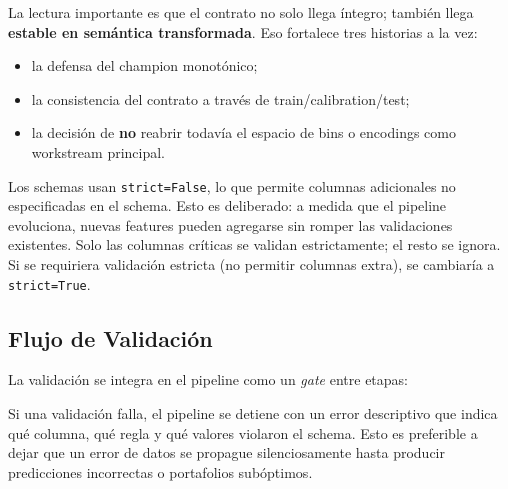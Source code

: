 \documentclass[
  spanish,
  11pt,
  letterpaper,
]{scrbook}
\providecommand{\tightlist}{%
  \setlength{\itemsep}{0pt}\setlength{\parskip}{0pt}}
\theoremstyle{plain}
\theoremstyle{remark}
\begin{document}
La lectura importante es que el contrato no solo llega íntegro; también
llega \textbf{estable en semántica transformada}. Eso fortalece tres
historias a la vez:

\begin{itemize}
\tightlist
\item
  la defensa del champion monotónico;
\item
  la consistencia del contrato a través de train/calibration/test;
\item
  la decisión de \textbf{no} reabrir todavía el espacio de bins o
  encodings como workstream principal.
\end{itemize}

\begin{tcolorbox}[enhanced jigsaw, arc=.35mm, bottomrule=.15mm, bottomtitle=1mm, breakable, colback=white, colbacktitle=quarto-callout-note-color!10!white, colframe=quarto-callout-note-color-frame, coltitle=black, left=2mm, leftrule=.75mm, opacityback=0, opacitybacktitle=0.6, rightrule=.15mm, title=\textcolor{quarto-callout-note-color}{\faInfo}\hspace{0.5em}{Validación estricta vs.~tolerante}, titlerule=0mm, toprule=.15mm, toptitle=1mm]

Los schemas usan \texttt{strict=False}, lo que permite columnas
adicionales no especificadas en el schema. Esto es deliberado: a medida
que el pipeline evoluciona, nuevas features pueden agregarse sin romper
las validaciones existentes. Solo las columnas críticas se validan
estrictamente; el resto se ignora. Si se requiriera validación estricta
(no permitir columnas extra), se cambiaría a \texttt{strict=True}.

\end{tcolorbox}

\subsection{Flujo de Validación}\label{flujo-de-validaciuxf3n}

La validación se integra en el pipeline como un \emph{gate} entre
etapas:

Si una validación falla, el pipeline se detiene con un error descriptivo
que indica qué columna, qué regla y qué valores violaron el schema. Esto
es preferible a dejar que un error de datos se propague silenciosamente
hasta producir predicciones incorrectas o portafolios subóptimos.
\end{document}
